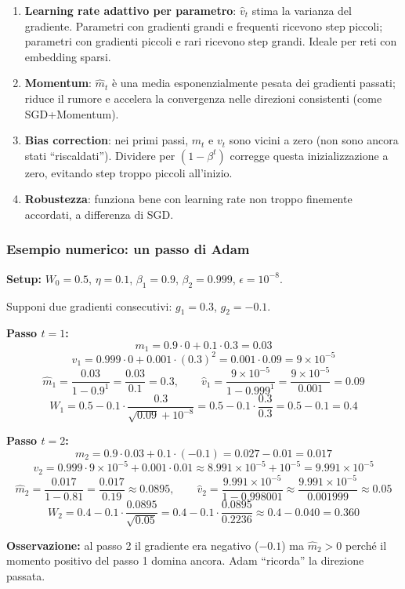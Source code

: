 \documentclass[
  11pt,
]{article}
\begin{document}
\begin{notabox}[title={\textbf{Perché Adam funziona bene?}}]
\begin{enumerate}
  \item \textbf{Learning rate adattivo per parametro}: $\hat{v}_t$ stima la varianza del gradiente. Parametri con gradienti grandi e frequenti ricevono step piccoli; parametri con gradienti piccoli e rari ricevono step grandi. Ideale per reti con embedding sparsi.
  \item \textbf{Momentum}: $\hat{m}_t$ è una media esponenzialmente pesata dei gradienti passati; riduce il rumore e accelera la convergenza nelle direzioni consistenti (come SGD+Momentum).
  \item \textbf{Bias correction}: nei primi passi, $m_t$ e $v_t$ sono vicini a zero (non sono ancora stati ``riscaldati''). Dividere per $(1-\beta^t)$ corregge questa inizializzazione a zero, evitando step troppo piccoli all'inizio.
  \item \textbf{Robustezza}: funziona bene con learning rate non troppo finemente accordati, a differenza di SGD.
\end{enumerate}
\end{notabox}

\subsubsection*{Esempio numerico: un passo di Adam}

\begin{notabox}[title={\textbf{Esempio: Adam al passo $t=1$ e $t=2$}}]
\textbf{Setup:} $W_0 = 0.5$, $\eta = 0.1$, $\beta_1 = 0.9$, $\beta_2 = 0.999$, $\epsilon = 10^{-8}$.

Supponi due gradienti consecutivi: $g_1 = 0.3$, $g_2 = -0.1$.

\medskip
\textbf{Passo $t=1$:}
\[
m_1 = 0.9 \cdot 0 + 0.1 \cdot 0.3 = 0.03
\]
\[
v_1 = 0.999 \cdot 0 + 0.001 \cdot (0.3)^2 = 0.001 \cdot 0.09 = 9 \times 10^{-5}
\]
\[
\hat{m}_1 = \frac{0.03}{1 - 0.9^1} = \frac{0.03}{0.1} = 0.3, \qquad
\hat{v}_1 = \frac{9 \times 10^{-5}}{1 - 0.999^1} = \frac{9 \times 10^{-5}}{0.001} = 0.09
\]
\[
W_1 = 0.5 - 0.1 \cdot \frac{0.3}{\sqrt{0.09} + 10^{-8}} = 0.5 - 0.1 \cdot \frac{0.3}{0.3} = 0.5 - 0.1 = \mathbf{0.4}
\]

\medskip
\textbf{Passo $t=2$:}
\[
m_2 = 0.9 \cdot 0.03 + 0.1 \cdot (-0.1) = 0.027 - 0.01 = 0.017
\]
\[
v_2 = 0.999 \cdot 9\times10^{-5} + 0.001 \cdot 0.01 \approx 8.991\times10^{-5} + 10^{-5} = 9.991\times10^{-5}
\]
\[
\hat{m}_2 = \frac{0.017}{1 - 0.81} = \frac{0.017}{0.19} \approx 0.0895, \qquad
\hat{v}_2 = \frac{9.991 \times 10^{-5}}{1 - 0.998001} \approx \frac{9.991\times10^{-5}}{0.001999} \approx 0.05
\]
\[
W_2 = 0.4 - 0.1 \cdot \frac{0.0895}{\sqrt{0.05}} = 0.4 - 0.1 \cdot \frac{0.0895}{0.2236} \approx 0.4 - 0.040 = \mathbf{0.360}
\]

\textbf{Osservazione:} al passo 2 il gradiente era negativo ($-0.1$) ma $\hat{m}_2 > 0$ perché il momento positivo del passo 1 domina ancora. Adam ``ricorda'' la direzione passata.
\end{notabox}
\end{document}
